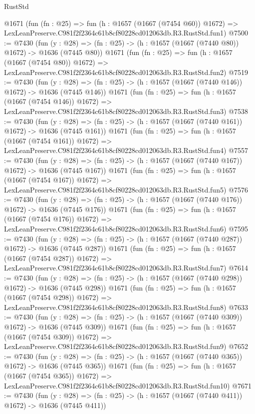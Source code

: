\begin{lexlean}{RustStd}
\begin{coremodule}
    @1671
    (fun (fn : @25) =>
    fun (h : @1657 (@1667 (@7454 @60)) @1672) =>
    LexLeanPreserve.C981f2f2364c61b8cf80228cd012063db.R3.RustStd.fun1)
@7500 := @7430
    (fun (y : @28) => (fn : @25) -> (h : @1657 (@1667 (@7440 @80)) @1672) -> @1636 (@7445 @80))
    @1671
    (fun (fn : @25) =>
    fun (h : @1657 (@1667 (@7454 @80)) @1672) =>
    LexLeanPreserve.C981f2f2364c61b8cf80228cd012063db.R3.RustStd.fun2)
@7519 := @7430
    (fun (y : @28) => (fn : @25) -> (h : @1657 (@1667 (@7440 @146)) @1672) -> @1636 (@7445 @146))
    @1671
    (fun (fn : @25) =>
    fun (h : @1657 (@1667 (@7454 @146)) @1672) =>
    LexLeanPreserve.C981f2f2364c61b8cf80228cd012063db.R3.RustStd.fun3)
@7538 := @7430
    (fun (y : @28) => (fn : @25) -> (h : @1657 (@1667 (@7440 @161)) @1672) -> @1636 (@7445 @161))
    @1671
    (fun (fn : @25) =>
    fun (h : @1657 (@1667 (@7454 @161)) @1672) =>
    LexLeanPreserve.C981f2f2364c61b8cf80228cd012063db.R3.RustStd.fun4)
@7557 := @7430
    (fun (y : @28) => (fn : @25) -> (h : @1657 (@1667 (@7440 @167)) @1672) -> @1636 (@7445 @167))
    @1671
    (fun (fn : @25) =>
    fun (h : @1657 (@1667 (@7454 @167)) @1672) =>
    LexLeanPreserve.C981f2f2364c61b8cf80228cd012063db.R3.RustStd.fun5)
@7576 := @7430
    (fun (y : @28) => (fn : @25) -> (h : @1657 (@1667 (@7440 @176)) @1672) -> @1636 (@7445 @176))
    @1671
    (fun (fn : @25) =>
    fun (h : @1657 (@1667 (@7454 @176)) @1672) =>
    LexLeanPreserve.C981f2f2364c61b8cf80228cd012063db.R3.RustStd.fun6)
@7595 := @7430
    (fun (y : @28) => (fn : @25) -> (h : @1657 (@1667 (@7440 @287)) @1672) -> @1636 (@7445 @287))
    @1671
    (fun (fn : @25) =>
    fun (h : @1657 (@1667 (@7454 @287)) @1672) =>
    LexLeanPreserve.C981f2f2364c61b8cf80228cd012063db.R3.RustStd.fun7)
@7614 := @7430
    (fun (y : @28) => (fn : @25) -> (h : @1657 (@1667 (@7440 @298)) @1672) -> @1636 (@7445 @298))
    @1671
    (fun (fn : @25) =>
    fun (h : @1657 (@1667 (@7454 @298)) @1672) =>
    LexLeanPreserve.C981f2f2364c61b8cf80228cd012063db.R3.RustStd.fun8)
@7633 := @7430
    (fun (y : @28) => (fn : @25) -> (h : @1657 (@1667 (@7440 @309)) @1672) -> @1636 (@7445 @309))
    @1671
    (fun (fn : @25) =>
    fun (h : @1657 (@1667 (@7454 @309)) @1672) =>
    LexLeanPreserve.C981f2f2364c61b8cf80228cd012063db.R3.RustStd.fun9)
@7652 := @7430
    (fun (y : @28) => (fn : @25) -> (h : @1657 (@1667 (@7440 @365)) @1672) -> @1636 (@7445 @365))
    @1671
    (fun (fn : @25) =>
    fun (h : @1657 (@1667 (@7454 @365)) @1672) =>
    LexLeanPreserve.C981f2f2364c61b8cf80228cd012063db.R3.RustStd.fun10)
@7671 := @7430
    (fun (y : @28) => (fn : @25) -> (h : @1657 (@1667 (@7440 @411)) @1672) -> @1636 (@7445 @411))

\end{coremodule}
\end{lexlean}
